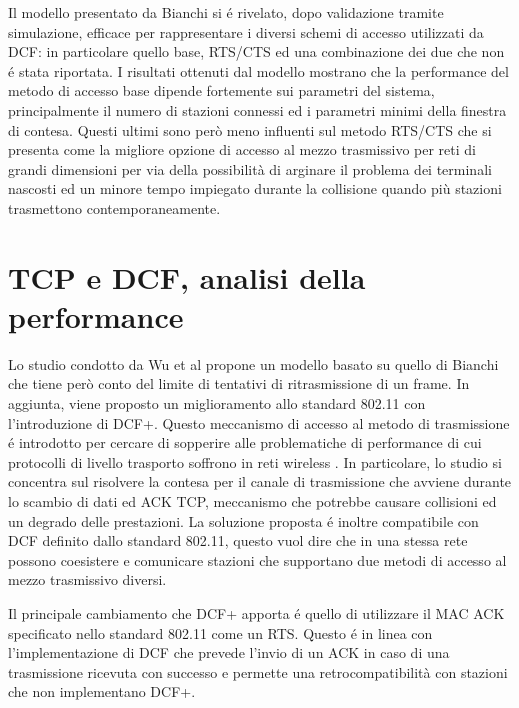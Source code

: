 Il modello presentato da Bianchi si \'e rivelato, dopo validazione tramite simulazione, efficace per rappresentare i diversi schemi di accesso utilizzati da DCF: in particolare quello base, RTS/CTS ed una combinazione dei due che non \'e stata riportata.
I risultati ottenuti dal modello mostrano che la performance del metodo di accesso base dipende fortemente sui parametri del sistema, principalmente il numero di stazioni connessi ed i parametri minimi della finestra di contesa.
Questi ultimi sono per\`o meno influenti sul metodo RTS/CTS che si presenta come la migliore opzione di accesso al mezzo trasmissivo per reti di grandi dimensioni per via della possibilit\`a di arginare il problema dei terminali nascosti ed un minore tempo impiegato durante la collisione quando pi\`u stazioni trasmettono contemporaneamente.

\newpage

\section{TCP e DCF, analisi della performance }

Lo studio condotto da Wu et al \cite{wu2002performance} propone un modello basato su quello di Bianchi che tiene per\`o conto del limite di tentativi di ritrasmissione di un frame.
In aggiunta, viene proposto un miglioramento allo standard 802.11 con l'introduzione di DCF+.
Questo meccanismo di accesso al metodo di trasmissione \'e introdotto per cercare di sopperire alle problematiche di performance di cui protocolli di livello trasporto soffrono in reti wireless \cite{xylomenos1999tcp}.
In particolare, lo studio si concentra sul risolvere la contesa per il canale di trasmissione che avviene durante lo scambio di dati ed ACK TCP, meccanismo che potrebbe causare collisioni ed un degrado delle prestazioni.
La soluzione proposta \'e inoltre compatibile con DCF definito dallo standard 802.11, questo vuol dire che in una stessa rete possono coesistere e comunicare stazioni che supportano due metodi di accesso al mezzo trasmissivo diversi.

Il principale cambiamento che DCF+ apporta \'e quello di utilizzare il MAC ACK specificato nello standard 802.11 come un RTS.
Questo \'e in linea con l'implementazione di DCF che prevede l'invio di un ACK in caso di una trasmissione ricevuta con successo e permette una retrocompatibilit\`a con stazioni che non implementano DCF+.

